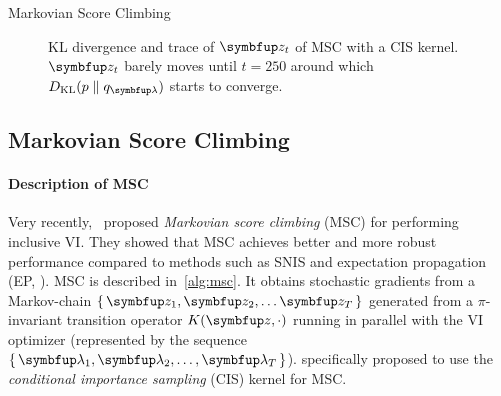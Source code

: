 \vspace{-0.1in}
%
  \begin{minipage}[l]{0.45\linewidth}
    \small
    \centering
    \begin{algorithm2e}[H]
      \DontPrintSemicolon
      \SetAlgoLined
      \caption{Markovian Score Climbing}\label{alg:msc}
    \end{algorithm2e}
    \vspace{-0.1in}
  \end{minipage}
  \qquad
  \begin{minipage}[r]{0.5\linewidth}
    \vspace{-0.1in}
    \begin{figure}[H]
      \centering
      
      \caption{KL divergence and trace of \(\vz_t\) of MSC with a CIS kernel.
        \(\vz_t\) barely moves until \(t=250\) around which \(\DKL{p}{q_{\vlambda}}\) starts to converge.}\label{fig:motivating}
    \end{figure}
    \vspace{-0.1in}
  \end{minipage}
%
\subsection{Markovian Score Climbing}\label{section:msc}
%
\paragraph{Description of MSC}
Very recently,~\citet{NEURIPS2020_b2070693} proposed \textit{Markovian score climbing} (MSC) for performing inclusive VI.
They showed that MSC achieves better and more robust performance compared to methods such as SNIS and expectation propagation (EP, \citealt{10.5555/2074022.2074067}).
MSC is described in~\cref{alg:msc}.
It obtains stochastic gradients from a Markov-chain \(\{\,\vz_1, \vz_2, \ldots \vz_T\,\}\) generated from a \(\pi\)-invariant transition operator \(K(\vz, \cdot)\) running in parallel with the VI optimizer (represented by the sequence \(\{\,\vlambda_1, \vlambda_2, \ldots, \vlambda_T\,\}\)).
\citeauthor{NEURIPS2020_b2070693} specifically proposed to use the \textit{conditional importance sampling} (CIS) kernel for MSC.

